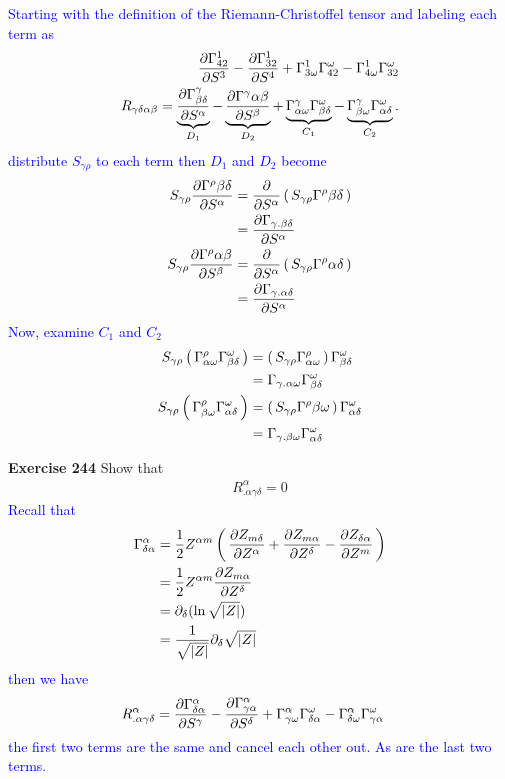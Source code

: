 \documentclass[12pt,a4paper]{report}
\newcommand{\BLUE}[1]{\textcolor{blue}{#1}}
\newcommand{\COFFF}[3]{\frac{1}{2}Z^{{#1}m}\PAREN{\PART{Z_{m{#2}}}{Z^{#3}} + \PART{Z_{m{#3}}}{Z^{#2}} - \PART{Z_{{#2}{#3}}}{Z^m}}}
\newcommand{\RIEMANN}[4]{ \PART{\Gamma^#1_{#4#2}}{S^#3} - \PART{\Gamma^#1_{#3#2}}{S^#4} + \Gamma^#1_{#3\omega}\Gamma^\omega_{#4#2} - \Gamma^#1_{#4\omega}\Gamma^{\omega}_{#3#2}}
\begin{document}
\begin{description}
\BLUE{Starting with the definition of the Riemann-Christoffel tensor and labeling each term as
\begin{align*}
	\RIEMANN{1}{2}{3}{4}\\
	R_{\gamma\delta\alpha\beta} = \underbrace{\PART{\Gamma^\gamma_{\beta\delta}}{S^\alpha}}_{D_1} - \underbrace{\PART{\Gamma^\gamma{\alpha\beta}}{S^\beta}}_{D_2} + \underbrace{\Gamma^\gamma_{\alpha\omega}\Gamma^\omega_{\beta\delta}}_{C_1} - \underbrace{\Gamma^\gamma_{\beta\omega}\Gamma^{\omega}_{\alpha\delta}}_{C_2}.
\end{align*}distribute $S_{\gamma\rho}$ to each term then $D_1$ and $D_2$ become
\begin{align*}
	S_{\gamma\rho}{\frac{\partial \Gamma^\rho{\beta\delta}}{\partial S^\alpha}} &= \frac{\partial }{\partial S^\alpha}\left (\, S_{\gamma\rho}\Gamma^\rho{\beta\delta} \,\right ) \\
&= \frac{\partial \Gamma_{\gamma.\beta\delta}}{\partial S^\alpha} \\
	S_{\gamma\rho}{\frac{\partial \Gamma^\rho{\alpha\beta}}{\partial S^\beta}} &= \frac{\partial }{\partial S^\alpha}\left (\, S_{\gamma\rho}\Gamma^\rho{\alpha\delta} \,\right ) \\
&= \frac{\partial \Gamma_{\gamma.\alpha\delta}}{\partial S^\alpha}
\end{align*}Now, examine $C_1$ and $C_2$
\begin{align*}
	S_{\gamma\rho}\left (\, \Gamma^\rho_{\alpha\omega}\Gamma^\omega_{\beta\delta} \,\right ) &= \left (\, S_{\gamma\rho}\Gamma^\rho_{\alpha\omega} \,\right )\Gamma^\omega_{\beta\delta} \\
	&= \Gamma_{\gamma.\alpha\omega}\Gamma^\omega_{\beta\delta} \\
	S_{\gamma\rho}\left (\, \Gamma^\rho_{\beta\omega}\Gamma^{\omega}_{\alpha\delta} \,\right ) &= \left (\, S_{\gamma\rho}\Gamma^\rho{\beta\omega} \,\right )\Gamma^{\omega}_{\alpha\delta} \\
	&= \Gamma_{\gamma.\beta\omega}\Gamma^\omega_{\alpha\delta}
\end{align*}
}

\item \textbf{Exercise 244} Show that
\begin{align*}
	R^\alpha_{.\alpha\gamma\delta} = 0
\end{align*}
\BLUE{Recall that 
\begin{align*}
	\Gamma^\alpha_{\delta\alpha} &= \COFFF{\alpha}{\delta}{\alpha} \\
		&= \frac{1}{2}Z^{\alpha m}\PART{Z_{m\alpha}}{Z^\delta} \\
		&= \partial_\delta (\ln \sqrt{|Z|}) \\
		&= \frac{1}{\sqrt{|Z|}} \partial_\delta \sqrt{|Z|}
\end{align*}then we have
\begin{align*}
	R^\alpha_{.\alpha\gamma\delta} &= \RIEMANN{\alpha}{\alpha}{\gamma}{\delta}
\end{align*}the first two terms are the same and cancel each other out.  As are the last two terms.
}


\end{description}
\end{document}

